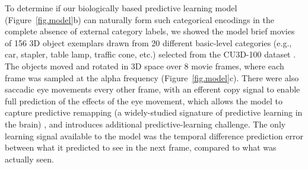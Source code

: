 \documentclass[12pt,twoside]{nature}
\newif\myifpdf
\begin{document}
To determine if our biologically based predictive learning model (Figure~\ref{fig.model}b) can naturally form such categorical encodings in the complete absence of external category labels, we showed the model brief movies of 156 3D object exemplars drawn from 20 different basic-level categories (e.g., car, stapler, table lamp, traffic cone, etc.) selected from the CU3D-100 dataset \cite{OReillyWyatteHerdEtAl13}.  The objects moved and rotated in 3D space over 8 movie frames, where each frame was sampled at the alpha frequency (Figure~\ref{fig.model}c).  There were also saccadic eye movements every other frame, with an efferent copy signal to enable full prediction of the effects of the eye movement, which allows the model to capture predictive remapping (a widely-studied signature of predictive learning in the brain) \cite{DuhamelColbyGoldberg92,CavanaghHuntAfrazEtAl10}, and introduces additional predictive-learning challenge.  The only learning signal available to the model was the temporal difference prediction error between what it predicted to see in the next frame, compared to what was actually seen.  
\end{document}

